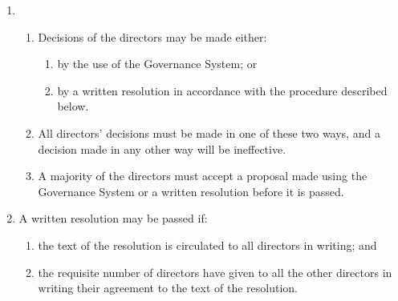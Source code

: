 \begin{enumerate}
\item
  \begin{enumerate}
    \item
    Decisions of the directors may be made either:
    \begin{enumerate}
        \item
        by the use of the Governance System; or
        \item
        by a written resolution in accordance with the procedure described below.
    \end{enumerate}
    \item
    All directors' decisions must be made in one of these two ways, and a decision
    made in any other way will be ineffective.
    \item
    A majority of the directors must accept a proposal made using the
    Governance System or a written resolution before it is passed.
  \end{enumerate}

\item
    A written resolution may be passed if:
    \begin{enumerate}
        \item
        the text of the resolution is circulated to all directors in writing; and
        \item
        the requisite number of directors have given to all the other directors in writing their
        agreement to the text of the resolution.
    \end{enumerate}


\end{enumerate}
